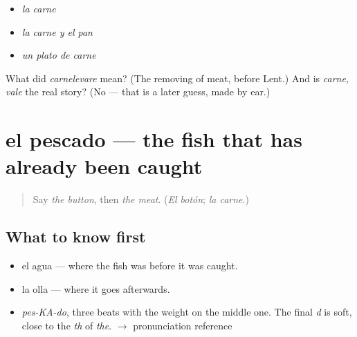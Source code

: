 \begin{itemize}
\raggedright
  \item \emph{la carne}
  \item \emph{la carne y el pan}
  \item \emph{un plato de carne}
\end{itemize}

\begin{tcolorbox}[breakable,colback=teal!4,colframe=teal!35!black,title={Before you move on}]
What did \emph{carnelevare} mean? (The removing of meat, before Lent.) And is \emph{carne, vale} the real story? (No — that is a later guess, made by ear.)
\end{tcolorbox}
\section[el pescado]{el pescado — the fish that has already been caught}

\label{lesson:ES-C361-pescado}



\begin{quote}
Say \emph{the button}, then \emph{the meat}. (\emph{El botón}; \emph{la carne}.)
\end{quote}

\subsection*{What to know first}
\begin{itemize}
\raggedright
  \item el agua — where the fish was before it was caught.
  \item la olla — where it goes afterwards.
\end{itemize}

\begin{sounds}
\begin{itemize}
\raggedright
  \item \emph{pes-KA-do}, three beats with the weight on the middle one. The final \emph{d} is soft, close to the \emph{th} of \emph{the}. $\to$ pronunciation reference
\end{itemize}
\end{sounds}

